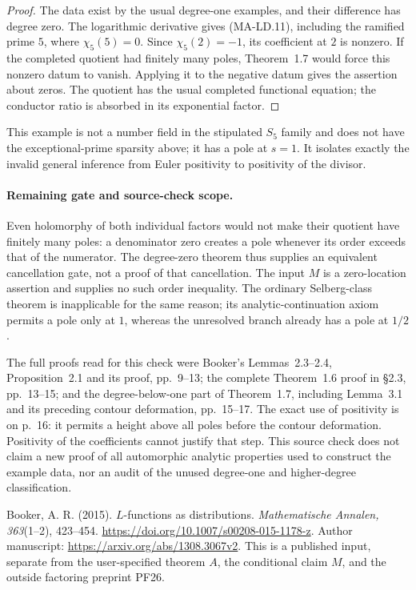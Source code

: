 \begin{proof}
The data exist by the usual degree-one examples, and their
difference has degree zero. The logarithmic derivative gives
(MA-LD.11), including the ramified prime $5$, where
$\chi_5(5)=0$. Since $\chi_5(2)=-1$, its coefficient at $2$
is nonzero. If the completed quotient had finitely many
poles, Theorem~1.7 would force this nonzero datum to vanish.
Applying it to the negative datum gives the assertion about
zeros. The quotient has the usual completed functional
equation; the conductor ratio is absorbed in its exponential
factor.\end{proof}

This example is not a number field in the stipulated $S_5$
family and does not have the exceptional-prime sparsity above;
it has a pole at $s=1$. It isolates exactly the invalid general
inference from Euler positivity to positivity of the divisor.

\paragraph{Remaining gate and source-check scope.}
Even holomorphy of both individual factors would not make their
quotient have finitely many poles: a denominator zero creates a
pole whenever its order exceeds that of the numerator. The
degree-zero theorem thus supplies an equivalent cancellation
gate, not a proof of that cancellation. The input $M$ is a
zero-location assertion and supplies no such order inequality.
The ordinary Selberg-class theorem is inapplicable for the same
reason; its analytic-continuation axiom permits a pole only at
$1$, whereas the unresolved branch already has a pole at $1/2$.

The full proofs read for this check were Booker's Lemmas~2.3--2.4,
Proposition~2.1 and its proof, pp.~9--13; the complete
Theorem~1.6 proof in \S2.3, pp.~13--15; and the degree-below-one
part of Theorem~1.7, including Lemma~3.1 and its preceding
contour deformation, pp.~15--17. The exact use of positivity is
on p.~16: it permits a height above all poles before the contour
deformation. Positivity of the coefficients cannot justify that
step. This source check does not claim a new proof of all
automorphic analytic properties used to construct the example
data, nor an audit of the unused degree-one and higher-degree
classification.

Booker, A. R. (2015). $L$-functions as distributions.
\emph{Mathematische Annalen, 363}(1--2), 423--454.
\url{https://doi.org/10.1007/s00208-015-1178-z}.
Author manuscript: \url{https://arxiv.org/abs/1308.3067v2}.
This is a published input, separate from the user-specified
theorem $A$, the conditional claim $M$, and the outside
factoring preprint PF26.
